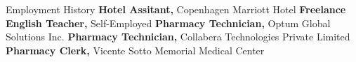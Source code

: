 \begin{rubric}{\faBriefcase[solid] Employment History}
\entry*[2025 -- now][]%
	\textbf{Hotel Assitant,} Copenhagen Marriott Hotel
\entry*[2021 -- 2023][]%
	\textbf{Freelance English Teacher,} Self-Employed
\entry*[2018 -- 2018][]%
	\textbf{Pharmacy Technician,} Optum Global Solutions Inc.
\entry*[2017 -- 2017][]%
	\textbf{Pharmacy Technician,} Collabera Technologies Private Limited
\entry*[2016 -- 2016][]%
	\textbf{Pharmacy Clerk,} Vicente Sotto Memorial Medical Center 
%
\end{rubric}